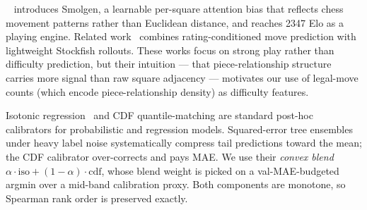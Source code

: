 \chessformer~\citep{monroe2024chessformer} introduces Smolgen, a learnable per-square attention bias that reflects chess movement patterns rather than Euclidean distance, and reaches 2347 Elo as a playing engine. Related work~\citep{zhang2024humanaligned} combines rating-conditioned move prediction with lightweight Stockfish rollouts. These works focus on strong play rather than difficulty prediction, but their intuition --- that piece-relationship structure carries more signal than raw square adjacency --- motivates our use of legal-move counts (which encode piece-relationship density) as difficulty features.

Isotonic regression~\citep{barlow1972isotonic} and CDF quantile-matching are standard post-hoc calibrators for probabilistic and regression models. Squared-error tree ensembles under heavy label noise systematically compress tail predictions toward the mean; the CDF calibrator over-corrects and pays MAE. We use their \emph{convex blend} $\alpha \cdot \text{iso} + (1-\alpha)\cdot \text{cdf}$, whose blend weight is picked on a val-MAE-budgeted argmin over a mid-band calibration proxy. Both components are monotone, so Spearman rank order is preserved exactly.
